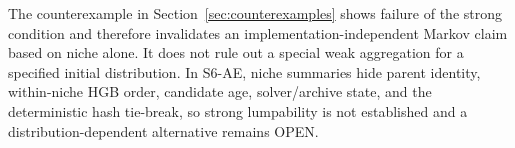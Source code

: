 The counterexample in Section~\ref{sec:counterexamples} shows failure of the
strong condition and therefore invalidates an implementation-independent
Markov claim based on niche alone. It does not rule out a special weak
aggregation for a specified initial distribution. In S6-AE, niche summaries
hide parent identity, within-niche HGB order, candidate age, solver/archive
state, and the deterministic hash tie-break, so strong lumpability is not
established and a distribution-dependent alternative remains OPEN.
